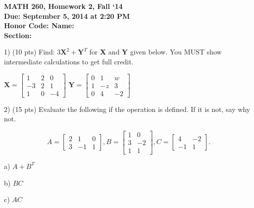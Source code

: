 \documentclass{article}
\begin{document}
\begin{flushleft}
	\bfseries{MATH 260, Homework 2, Fall `14}\\
	\bfseries{Due: September 5, 2014 at 2:20 PM}\\
	\bfseries{Honor Code:} \hspace{3.5in}\bfseries{Name:}\\
	\hspace{4.37in}\bfseries{Section:}
\end{flushleft}
\begin{flushleft}
\vspace{.25in}

1) (10 pts) Find: $3\textbf{X}^{2} + \textbf{Y}^{T}$ for \textbf{X} and \textbf{Y} given below.  You MUST show intermediate calculations to get full credit.

\vspace{0.2in}

\begin{center}

$\textbf{X}=\left[
\begin{array}{ccc}
1 & 2 & 0\\
-3 & 2 & 1\\
1 & 0 & -4
\end{array}
\right]
$
\hspace{0.1in}
$\textbf{Y}=\left[
\begin{array}{ccc}
0 & 1 & w\\
1 & -z & 3\\
0 & 4 & -2
\end{array}
\right]
$

\end{center}

\pagebreak

2) (15 pts) Evaluate the following if the operation is defined.  If it is not, say why not.

\begin{equation*}
A = 
\begin{bmatrix}
2 & 1 & 0\\
3 & -1 & 1
\end{bmatrix}, B = 
\begin{bmatrix}
1 & 0 \\
3 & -2 \\
1 & 1 
\end{bmatrix}, C =
\begin{bmatrix}
4 & -2 \\
-1 & 1
\end{bmatrix}.
\end{equation*}

a) $A + B^{T}$

\vspace{1.5in}

b) $BC$

\vspace{1.5in}

c) $AC$

\end{flushleft}
\end{document}
